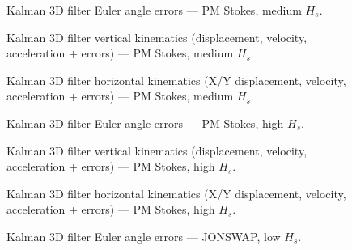 \documentclass[11pt,letterpaper]{article}
\begin{document}
\begin{figure}[H]\centering
  \resizebox{\textwidth}{!}{}
  \caption{Kalman 3D filter Euler angle errors — PM Stokes, medium $H_s$.}
  \label{fig:w3d_pmstokes_medium_angle_errs}
\end{figure}

\begin{figure}[H]\centering
  \resizebox{\textwidth}{!}{}
  \caption{Kalman 3D filter vertical kinematics (displacement, velocity, acceleration + errors) — PM Stokes, medium $H_s$.}
  \label{fig:w3d_pmstokes_medium_zkin}
\end{figure}

\begin{figure}[H]\centering
  \resizebox{\textwidth}{!}{}
  \caption{Kalman 3D filter horizontal kinematics (X/Y displacement, velocity, acceleration + errors) — PM Stokes, medium $H_s$.}
  \label{fig:w3d_pmstokes_medium_xykin}
\end{figure}

\begin{figure}[H]\centering
  \resizebox{\textwidth}{!}{}
  \caption{Kalman 3D filter Euler angle errors — PM Stokes, high $H_s$.}
  \label{fig:w3d_pmstokes_high_angle_errs}
\end{figure}

\begin{figure}[H]\centering
  \resizebox{\textwidth}{!}{}
  \caption{Kalman 3D filter vertical kinematics (displacement, velocity, acceleration + errors) — PM Stokes, high $H_s$.}
  \label{fig:w3d_pmstokes_high_zkin}
\end{figure}

\begin{figure}[H]\centering
  \resizebox{\textwidth}{!}{}
  \caption{Kalman 3D filter horizontal kinematics (X/Y displacement, velocity, acceleration + errors) — PM Stokes, high $H_s$.}
  \label{fig:w3d_pmstokes_high_xykin}
\end{figure}

\begin{figure}[H]\centering
  \resizebox{\textwidth}{!}{}
  \caption{Kalman 3D filter Euler angle errors — JONSWAP, low $H_s$.}
  \label{fig:w3d_jonswap_low_angle_errs}
\end{figure}
\end{document}
